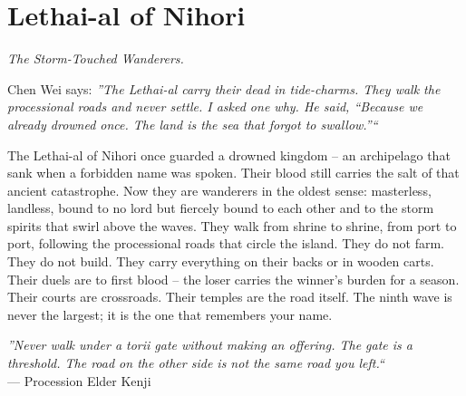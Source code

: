 \documentclass[12pt,oneside]{book}
\begin{document}
\newpage

\newpage

\chapter{Lethai-al of Nihori}
\emph{The Storm-Touched Wanderers.}

\noindent
Chen Wei says: \textit{''The Lethai-al carry their dead in tide-charms. They walk the processional roads and never settle. I asked one why. He said, ``Because we already drowned once. The land is the sea that forgot to swallow.''``}

\noindent
The Lethai-al of Nihori once guarded a drowned kingdom -- an archipelago that sank when a forbidden name was spoken. Their blood still carries the salt of that ancient catastrophe. Now they are wanderers in the oldest sense: masterless, landless, bound to no lord but fiercely bound to each other and to the storm spirits that swirl above the waves. They walk from shrine to shrine, from port to port, following the processional roads that circle the island. They do not farm. They do not build. They carry everything on their backs or in wooden carts. Their duels are to first blood -- the loser carries the winner's burden for a season. Their courts are crossroads. Their temples are the road itself. The ninth wave is never the largest; it is the one that remembers your name.

\vspace{0.5em}
\noindent\textit{''Never walk under a torii gate without making an offering. The gate is a threshold. The road on the other side is not the same road you left.``} \\
--- Procession Elder Kenji
\end{document}

